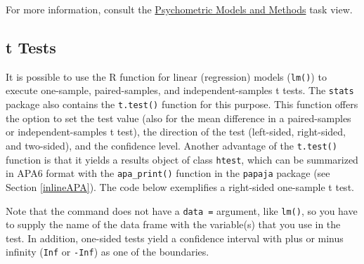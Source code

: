 \documentclass[doc,floatsintext]{apa6}
\newenvironment{Shaded}{\begin{snugshade}}{\end{snugshade}}
\newcommand{\KeywordTok}[1]{\textcolor[rgb]{0.13,0.29,0.53}{\textbf{#1}}}
\newcommand{\DataTypeTok}[1]{\textcolor[rgb]{0.13,0.29,0.53}{#1}}
\newcommand{\FloatTok}[1]{\textcolor[rgb]{0.00,0.00,0.81}{#1}}
\newcommand{\StringTok}[1]{\textcolor[rgb]{0.31,0.60,0.02}{#1}}
\newcommand{\CommentTok}[1]{\textcolor[rgb]{0.56,0.35,0.01}{\textit{#1}}}
\newcommand{\OperatorTok}[1]{\textcolor[rgb]{0.81,0.36,0.00}{\textbf{#1}}}
\newcommand{\NormalTok}[1]{#1}
\begin{document}
For more information, consult the
\href{https://cran.r-project.org/web/views/Psychometrics.html}{Psychometric
Models and Methods} task view.

\subsection{t Tests}\label{ttests}

It is possible to use the R function for linear (regression) models
(\texttt{lm()}) to execute one-sample, paired-samples, and
independent-samples t tests. The \texttt{stats} package also contains
the \texttt{t.test()} function for this purpose. This function offers
the option to set the test value (also for the mean difference in a
paired-samples or independent-samples t test), the direction of the test
(left-sided, right-sided, and two-sided), and the confidence level.
Another advantage of the \texttt{t.test()} function is that it yields a
results object of class \texttt{htest}, which can be summarized in APA6
format with the \texttt{apa\_print()} function in the \texttt{papaja}
package (see Section \ref{inlineAPA}). The code below exemplifies a
right-sided one-sample t test.

\begin{Shaded}
\end{Shaded}

Note that the command does not have a \texttt{data\ =} argument, like
\texttt{lm()}, so you have to supply the name of the data frame with the
variable(s) that you use in the test. In addition, one-sided tests yield
a confidence interval with plus or minus infinity (\texttt{Inf} or
\texttt{-Inf}) as one of the boundaries.
\end{document}
